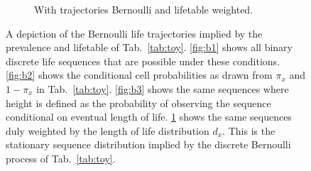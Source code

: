 \documentclass{bmcart}
\begin{document}
\begin{figure}
\begin{subfigure}[b]{0.4\textwidth}
        \caption{With trajectories Bernoulli and lifetable weighted.\\}
        \label{fig:b4}
    \end{subfigure}
    \caption{A depiction of the Bernoulli life trajectories implied by the prevalence and lifetable of Tab.~\ref{tab:toy}. \ref{fig:b1} shows all binary discrete life sequences that are possible under these conditions. \ref{fig:b2} shows the conditional cell probabilities as drawn from $\pi_x$ and $1-\pi_x$ in Tab.~\ref{tab:toy}. \ref{fig:b3} shows the same sequences where height is defined as the probability of observing the sequence conditional on eventual length of life. \ref{fig:b4} shows the same sequences duly weighted by the length of life distribution $d_x$. This is the stationary sequence distribution implied by the discrete Bernoulli process of Tab.~\ref{tab:toy}. }\label{fig:bernexplain}
\end{figure}
\FloatBarrier
\end{document}
